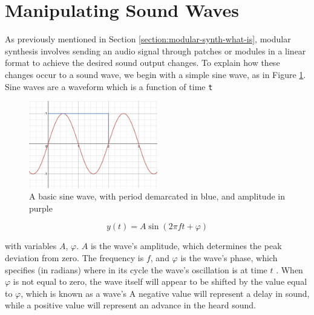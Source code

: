 \section{Manipulating Sound Waves}\label{section:manip-waves}
As previously mentioned in Section \ref{section:modular-synth-what-is}, modular synthesis involves sending an audio signal through patches or modules in a linear format to achieve the desired sound output changes. To explain how these changes occur to a sound wave, we begin with a simple sine wave, as in Figure \ref{fig:sine-wave-period-amplitude}. Sine waves are a waveform which is a function of time \texttt{t}

\begin{figure}
	\centering
	\includegraphics[width=0.5\textwidth]{figures/sine-wave-period-amplitude.png}
	\caption{A basic sine wave, with period demarcated in blue, and amplitude in purple}
	\label{fig:sine-wave-period-amplitude}
\end{figure}

\begin{equation}\label{eq:full-sine-wave-equation}
	y(t) = A \sin(2\pi ft + \varphi)
\end{equation}

with variables $A$, $\varphi$. $A$ is the wave's amplitude, which determines the peak deviation from zero. The frequency is $f$, and $\varphi$ is the wave's phase, which specifies (in radians) where in its cycle the wave's oscillation is at time $t$ \cite{Kirk_Hunt_2013}. When $\varphi$ is not equal to zero, the wave itself will appear to be shifted by the value equal to $\varphi$, which is known as a wave's  A negative value will represent a delay in sound, while a positive value will represent an advance in the heard sound.

